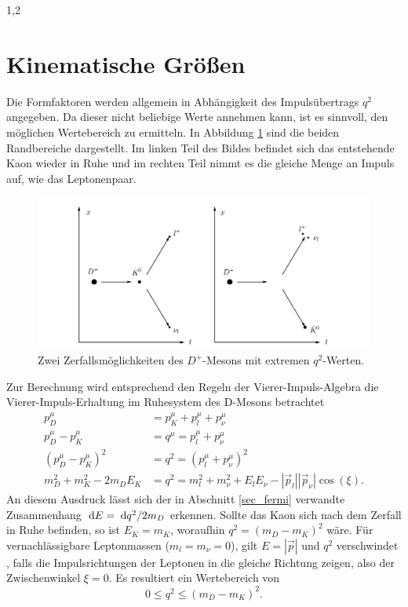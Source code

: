 \documentclass[11pt,a4paper,twoside]{report}
\begin{document}
\begin{spacing}{1,2}
\section{Kinematische Größen}
\vspace{-0.5cm}
Die Formfaktoren werden allgemein in Abhängigkeit des Impulsübertrags $q^2$ angegeben. Da dieser nicht beliebige Werte annehmen kann, ist es sinnvoll, den 
möglichen Wertebereich zu ermitteln.  In Abbildung \ref{pic_DZerfall} sind die beiden Randbereiche dargestellt. Im linken Teil des Bildes befindet sich das 
entstehende Kaon wieder in Ruhe und im rechten Teil nimmt es die gleiche Menge an Impuls auf, wie das Leptonenpaar.
\begin{figure}[H]
\includegraphics[width=1\textwidth]{Abbildungen/DZerfall.png}
\caption{Zwei Zerfallsmöglichkeiten des $D^+$-Mesons  mit extremen $q^2$-Werten.}
\label{pic_DZerfall}
\end{figure}
\noindent
Zur Berechnung wird entsprechend den Regeln der Vierer-Impuls-Algebra die Vierer-Impuls-Erhaltung im Ruhesystem des D-Mesons betrachtet
\begin{align}
 p_D^\mu &= p_K^\mu + p_l^\mu + p_\nu^\mu \nonumber\\
 p_D^\mu - p_K^\mu &= q^\mu = p_l^\mu + p_\nu^\mu \nonumber\\
 \left(p_D^\mu-p_K^\mu\right)^2 &= q^2 =  (p_l^\mu + p_\nu^\mu )^2\nonumber\\
 m_D^2 + m_K^2 - 2m_DE_K &= q^2 = m_l^2 + m_\nu^2 + E_lE_\nu - |\vec p_l||\vec p_\nu|\cos(\xi).
\end{align}
An diesem Ausdruck lässt sich der in Abschnitt \ref{sec_fermi} verwandte Zusammenhang $\; \mathrm{d} E = \; \mathrm{d} q^2/2m_D$ erkennen.
Sollte das Kaon sich nach dem Zerfall in Ruhe befinden, so ist $E_K = m_K$, woraufhin $q^2 = (m_D-m_K)^2$ wäre. Für vernachlässigbare Leptonmassen 
($m_l=m_\nu=0$), gilt $E=|\vec p|$ und $q^2$ verschwindet , falls die Impulsrichtungen der Leptonen in die gleiche Richtung zeigen, also der Zwischenwinkel
$\xi = 0$. Es resultiert ein Wertebereich von
\begin{equation}
 0 \leq q^2 \leq (m_D - m_K)^2.
\end{equation}


\end{spacing}
\end{document}
